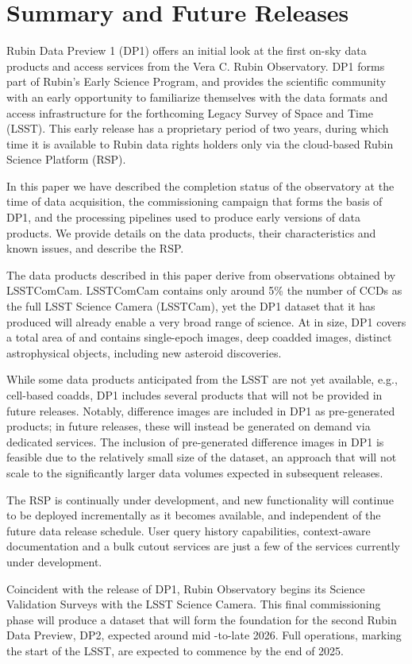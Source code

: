 \section{Summary and Future Releases}
\label{sec:summary}

Rubin Data Preview 1 (\gls{DP1}) offers an initial look at the first on-sky data products and access services from the Vera C. Rubin Observatory. \gls{DP1} forms part of Rubin's Early Science Program, and provides the scientific community with an early opportunity to familiarize themselves with the data formats and access infrastructure for the forthcoming Legacy Survey of Space and Time (LSST).
This early release has a proprietary period of two years, during which time it is  available to Rubin data rights holders only via the cloud-based Rubin Science Platform (\gls{RSP}).

In this paper we have described the completion status of the observatory at the time of data acquisition, the commissioning campaign that forms the basis of \gls{DP1}, and the processing pipelines used to produce early versions of data products.
We provide details on the data products, their characteristics and
known issues, and describe the \gls{RSP}.

The data products described in this paper derive from observations obtained by \gls{LSSTComCam}. \gls{LSSTComCam} contains only around 5\% the number of CCDs as the full LSST Science Camera (LSSTCam), yet the DP1 dataset that it has produced will already enable a very broad range of science.
At \sizeinbytes in size, DP1 covers a total area of \totalarea and contains \nexposures single-\gls{epoch} images, \ndeepcoadds deep coadded images, \nobjects distinct astrophysical objects, including  \nnewasteroiddiscoveries  new asteroid discoveries.

While some data products anticipated from the LSST are not yet available, e.g., cell-based coadds, DP1 includes several products that will not be provided in future releases.
Notably, difference images are included in DP1 as pre-generated products; in future releases, these will instead be generated on demand via dedicated services.
The inclusion of pre-generated difference images in DP1 is feasible due to the relatively small size of the dataset, an approach that will not scale to the significantly larger data volumes expected in subsequent releases.

The \gls{RSP} is continually under development, and new functionality will continue to be deployed incrementally as it becomes available, and independent of the future data release schedule.
User query history capabilities, context-aware documentation and a bulk cutout services are just a few of the services currently under development.

Coincident with the release of DP1, Rubin Observatory begins its Science Validation Surveys with the LSST Science Camera.
This final commissioning phase will produce a dataset that will form the foundation for the second Rubin Data Preview, \gls{DP2}, expected around mid -to-late 2026.
Full operations, marking the start of the \gls{LSST}, are expected to commence by the end of 2025.